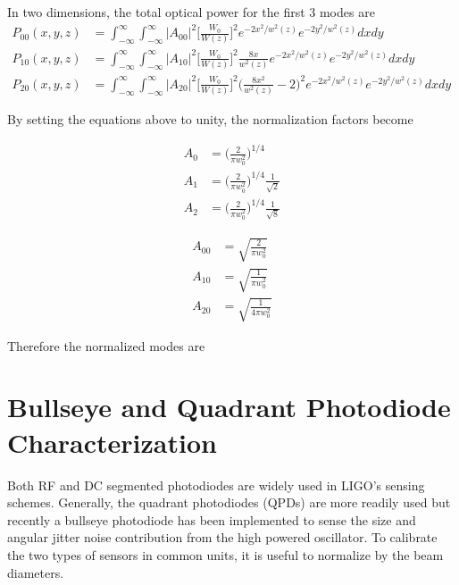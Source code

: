 \begin{appendices}
	In two dimensions, the total optical power for the first 3 modes are
	\begin{equation}
	\label{HGNormalInt2D}
	\begin{aligned}
		P_{00}(x,y,z) 	& 	=	 \int_{-\infty}^{\infty} \int_{-\infty}^{\infty}  \vert A_{00} \vert^2   \bigg[ \frac{W_0}{W(z)} \bigg]^2 e^{-2x^2/w^2(z)}e^{-2y^2/w^2(z)} dx dy&
	\\	P_{10}(x,y,z)	&	=	\int_{-\infty}^{\infty} \int_{-\infty}^{\infty}  \vert A_{10} \vert^2  \bigg[ \frac{W_0}{W(z)} \bigg]^2 \frac{8x}{w^2(z)} e^{-2x^2/w^2(z)}e^{-2y^2/w^2(z)} dx dy&
	\\	P_{20}(x,y,z)	&	= 	\int_{-\infty}^{\infty} \int_{-\infty}^{\infty}  \vert A_{20} \vert^2   \bigg[ \frac{W_0}{W(z)} \bigg]^2 \bigg(\frac{8x^2}{w^2(z)} - 2\bigg)^2 e^{-2x^2/w^2(z)}e^{-2y^2/w^2(z)} dx dy
	\end{aligned}
	\end{equation}
	
	By setting the equations above to unity, the normalization factors become
	
	\begin{equation}
	\begin{aligned}
		A_{0} &	= \bigg( \frac{2}{\pi w_0^2} \bigg)^{1/4} 
	\\	A_{1} &	= \bigg( \frac{2}{\pi w_0^2} \bigg)^{1/4} \frac{1}{\sqrt{2}}
	\\	A_{2} &	= \bigg( \frac{2}{\pi w_0^2} \bigg)^{1/4} \frac{1}{\sqrt{8}}
	\end{aligned}
	\end{equation}
	
	\begin{equation}
	\begin{aligned}
		A_{00} &	= \sqrt{\frac{2}{\pi w_0^2}}
	\\	A_{10} &	= \sqrt{\frac{1}{\pi w_0^2}}
	\\	A_{20} &	= \sqrt{\frac{1}{4\pi w_0^2}}
	\end{aligned}
	\end{equation}
	
	Therefore the normalized modes are
	

	
	\chapter{Bullseye and Quadrant Photodiode Characterization}\label{BPDchar}
	Both RF and DC segmented photodiodes are widely used in LIGO's sensing schemes.  Generally, the quadrant photodiodes (QPDs) are more readily used but recently a bullseye photodiode has been implemented to sense the size and angular jitter noise contribution from the high powered oscillator.  To calibrate the two types of sensors in common units, it is useful to normalize by the beam diameters.

\end{appendices}
